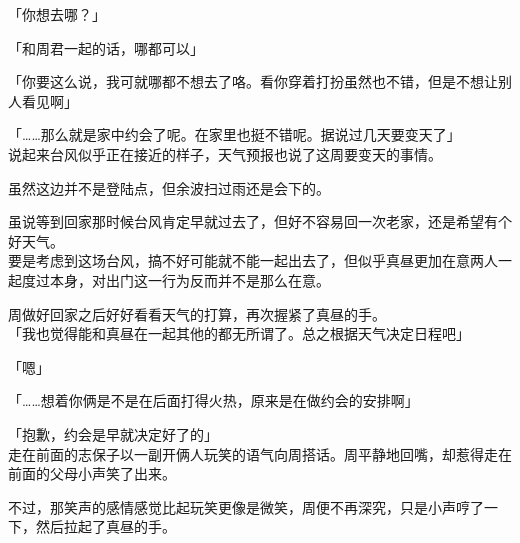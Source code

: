 「你想去哪？」

「和周君一起的话，哪都可以」

「你要这么说，我可就哪都不想去了咯。看你穿着打扮虽然也不错，但是不想让别人看见啊」

「……那么就是家中约会了呢。在家里也挺不错呢。据说过几天要变天了」\\

说起来台风似乎正在接近的样子，天气预报也说了这周要变天的事情。

虽然这边并不是登陆点，但余波扫过雨还是会下的。

虽说等到回家那时候台风肯定早就过去了，但好不容易回一次老家，还是希望有个好天气。\\

要是考虑到这场台风，搞不好可能就不能一起出去了，但似乎真昼更加在意两人一起度过本身，对出门这一行为反而并不是那么在意。

周做好回家之后好好看看天气的打算，再次握紧了真昼的手。\\

「我也觉得能和真昼在一起其他的都无所谓了。总之根据天气决定日程吧」

「嗯」

「……想着你俩是不是在后面打得火热，原来是在做约会的安排啊」

「抱歉，约会是早就决定好了的」\\

走在前面的志保子以一副开俩人玩笑的语气向周搭话。周平静地回嘴，却惹得走在前面的父母小声笑了出来。

不过，那笑声的感情感觉比起玩笑更像是微笑，周便不再深究，只是小声哼了一下，然后拉起了真昼的手。

